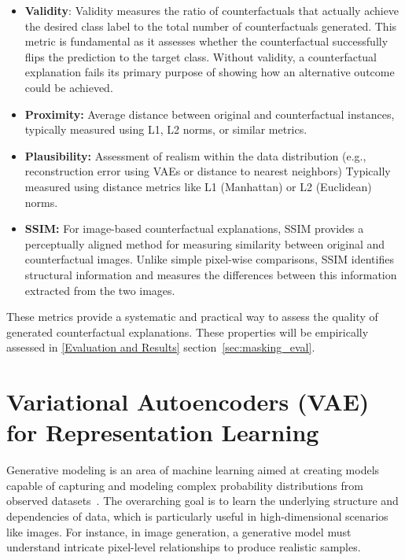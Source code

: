 \begin{itemize}
    \item \textbf{Validity}: Validity measures the ratio of counterfactuals that actually achieve the desired class label to the total number of counterfactuals generated. This metric is fundamental as it assesses whether the counterfactual successfully flips the prediction to the target class. Without validity, a counterfactual explanation fails its primary purpose of showing how an alternative outcome could be achieved.
    \item \textbf{Proximity:} Average distance between original and counterfactual instances, typically measured using L1, L2 norms, or similar metrics.
    \item \textbf{Plausibility:} Assessment of realism within the data distribution (e.g., reconstruction error using VAEs or distance to nearest neighbors) Typically measured using distance metrics like L1 (Manhattan) or L2 (Euclidean) norms.
    \item \textbf{SSIM:} For image-based counterfactual explanations, SSIM provides a perceptually aligned method for measuring similarity between original and counterfactual images. Unlike simple pixel-wise comparisons, SSIM identifies structural information and measures the differences between this information extracted from the two images. 
\end{itemize}

These metrics provide a systematic and practical way to assess the quality of generated counterfactual explanations. These properties will be empirically assessed in \cref{Evaluation and Results} section~\ref{sec:masking_eval}.





















\section{Variational Autoencoders (VAE) for Representation Learning}
Generative modeling is an area of machine learning aimed at creating models capable of capturing and modeling complex probability distributions from observed datasets~\cite{doersch2016tutorial}. The overarching goal is to learn the underlying structure and dependencies of data, which is particularly useful in high-dimensional scenarios like images. For instance, in image generation, a generative model must understand intricate pixel-level relationships to produce realistic samples.

